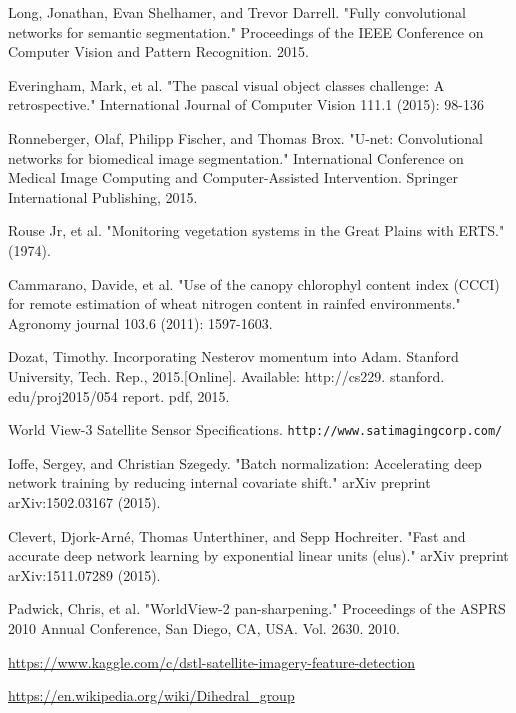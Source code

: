 \documentclass[10pt,twocolumn,letterpaper]{article}
\begin{document}
\begin{thebibliography}{10}

	 Long, Jonathan, Evan Shelhamer, and Trevor Darrell. "Fully convolutional networks for semantic segmentation." Proceedings of the IEEE Conference on Computer Vision and Pattern Recognition. 2015.

	 Everingham, Mark, et al. "The pascal visual object classes challenge: A retrospective." International Journal of Computer Vision 111.1 (2015): 98-136


	 Ronneberger, Olaf, Philipp Fischer, and Thomas Brox. "U-net: Convolutional networks for biomedical image segmentation." International Conference on Medical Image Computing and Computer-Assisted Intervention. Springer International Publishing, 2015.

	 Rouse Jr, et al. "Monitoring vegetation systems in the Great Plains with ERTS." (1974).

	 Cammarano, Davide, et al. "Use of the canopy chlorophyl content index (CCCI) for remote estimation of wheat nitrogen content in rainfed environments." Agronomy journal 103.6 (2011): 1597-1603.

	 Dozat, Timothy. Incorporating Nesterov momentum into Adam. Stanford University, Tech. Rep., 2015.[Online]. Available: http://cs229. stanford. edu/proj2015/054 report. pdf, 2015.

	 World View-3 Satellite Sensor Specifications.  \texttt{http://www.satimagingcorp.com/}

	 Ioffe, Sergey, and Christian Szegedy. "Batch normalization: Accelerating deep network training by reducing internal covariate shift." arXiv preprint arXiv:1502.03167 (2015).

	 Clevert, Djork-Arné, Thomas Unterthiner, and Sepp Hochreiter. "Fast and accurate deep network learning by exponential linear units (elus)." arXiv preprint arXiv:1511.07289 (2015).

	 Padwick, Chris, et al. "WorldView-2 pan-sharpening." Proceedings of the ASPRS 2010 Annual Conference, San Diego, CA, USA. Vol. 2630. 2010.

	 \url{https://www.kaggle.com/c/dstl-satellite-imagery-feature-detection}

	 \url{https://en.wikipedia.org/wiki/Dihedral_group}

\end{thebibliography}
\end{document}
